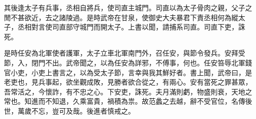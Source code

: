 其後逢太子有兵事，丞相自將兵，使司直主城門。司直以為太子骨肉之親，父子之閒不甚欲近，去之諸陵過。是時武帝在甘泉，使御史大夫暴君下責丞相何為縱太子，丞相對言使司直部守城門而開太子。上書以聞，請捕系司直。司直下吏，誅死。

是時任安為北軍使者護軍，太子立車北軍南門外，召任安，與節令發兵。安拜受節，入，閉門不出。武帝聞之，以為任安為詳邪，不傅事，何也。任安笞辱北軍錢官小吏，小吏上書言之，以為受太子節，言幸與我其鮮好者。書上聞，武帝曰，是老吏也，見兵事起，欲坐觀成敗，見勝者欲合從之，有兩心。安有當死之罪甚眾，吾常活之，今懷詐，有不忠之心。下安吏，誅死。夫月滿則虧，物盛則衰，天地之常也。知進而不知退，久乘富貴，禍積為祟。故范蠡之去越，辭不受官位，名傳後世，萬歲不忘，豈可及哉。後進者慎戒之。